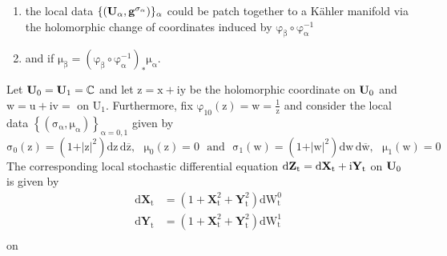 \documentclass[10 pt,english]{smfart}
\newcommand{\Z}{{\bf{Z}_{\textrm{t}}}}
\newcommand{\Xt}{\mathrm{\mathbf{X}}_{t}}
\newcommand{\Yt}{\mathrm{\mathbf{Y}}_{t}}
\newcommand{\g}{\mathrm{\mathbf{g}}}
\newcommand{\U}{{\bf{U}}}
\begin{document}
\begin{enumerate}
\item the local data $\mathrm{\{\left(\U_{\alpha},\g^{\sigma_{\alpha}}\right)\}_{\alpha}}$ could be patch together to a K\"ahler manifold via the holomorphic change of coordinates induced by $\mathrm{\varphi_{\beta}\circ\varphi^{-1}_{\alpha}}$ 
\item and if $\mathrm{\mu_{\beta}= \left(\varphi_{\beta}\circ\varphi^{-1}_{\alpha}\right)_{*}\mu_{\alpha}}$.
\end{enumerate}

\begin{exem} Let $\mathrm{\U_{0}=\U_{1}=\mathbb{C}}$ and let $\mathrm{z=x+iy}$ be the holomorphic coordinate on $\mathrm{\U_{0}}$ and $\mathrm{w=u+iv=}$ on $\mathrm{U_{1}}$. Furthermore, fix $\mathrm{\varphi_{10}\left(z\right)=w=\frac{1}{z}}$ and consider the local data $\mathrm{\left\{(\sigma_{\alpha},\mu_{\alpha})\right\}_{\alpha=0,1}}$ given by
\begin{equation}
\mathrm{\sigma_{0}\left(z\right)=\left(1+\vert z\vert^2\right)dz\,d\overline{z},\,\,\,\,\mu_{0}(z)=0\,\,\,\, and\,\,\,\, \sigma_{1}\left(w\right)=\left(1+\vert w\vert^2\right)dw\,d\overline{w},\,\,\,\, \mu_{1}(w)=0}
\end{equation} The corresponding local stochastic differential equation $\mathrm{d\Z=d\Xt+i\Yt}$ on $\mathrm{\U_{0}}$ is given by 
\begin{equation}
\begin{split}
\mathrm{d\mathbf{X}_{t}}&=\mathrm{\left(1+\mathbf{X}_{t}^{2}+\mathbf{Y}_{t}^{2}\right)dW^{0}_{t}}\\
\mathrm{d\mathbf{Y}_{t}}&=\mathrm{\left(1+\mathbf{X}_{t}^{2}+\mathbf{Y}_{t}^{2}\right)dW^{1}_{t}}\\
\end{split}
\end{equation} on 

\end{exem}

 
\end{document}
